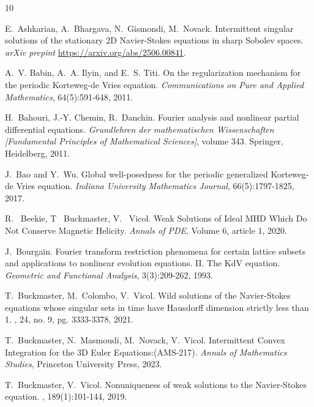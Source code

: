 \documentclass[12pt,reqno,letterpaper]{amsart}
\numberwithin{equation}{section}
\newcommand{\1}{{\bf 1}}
\newcommand{\2}{{\bf 2}}
\theoremstyle{remark}
\theoremstyle{remark}
\begin{document}
\begin{thebibliography}{10}

    E.~Ashkarian, A.~Bhargava, N.~Gismondi, M.~Novack.
    \newblock Intermittent singular solutions of the stationary 2D Navier-Stokes
    equations in sharp Sobolev spaces.
    \newblock \emph{arXiv prepint} \url{https://arxiv.org/abs/2506.00841}.

    A.~V. Babin, A.~A. Ilyin, and E.~S. Titi.
    \newblock On the regularization mechanism for the periodic
    Korteweg-de Vries equation.
    \newblock \emph{Communications on Pure and Applied Mathematics},
    64(5):591-648, 2011.

    H.~Bahouri, J.-Y. Chemin, R.~Danchin.
    \newblock Fourier analysis and nonlinear partial differential equations.
    \newblock \textit{Grundlehren der mathematischen Wissenschaften [Fundamental Principles of Mathematical Sciences]}, volume 343.  Springer, Heidelberg, 2011.

    J.~Bao and Y.~Wu.
    \newblock Global well-posedness for the periodic generalized
    Korteweg-de Vries equation.
    \newblock \emph{Indiana University Mathematics Journal}, 66(5):1797-1825, 2017.

    R. ~Beekie, T ~Buckmaster, V. ~Vicol.
    \newblock Weak Solutions of Ideal MHD Which Do Not Conserve Magnetic Helicity.
    \newblock \emph{Annals of PDE}, Volume 6, article 1, 2020.
    
    J.~Bourgain.
    \newblock Fourier transform restriction phenomena for certain lattice subsets
    and applications to nonlinear evolution equations. II. The \textsf{KdV} equation.
    \newblock \emph{Geometric and Functional Analysis}, 3(3):209-262, 1993.

    \newblock T.~Buckmaster, M.~Colombo, V.~Vicol.
    \newblock Wild solutions of the Navier-Stokes equations whose singular sets in time have Hausdorff dimension strictly less than 1.
    , 24, no. 9, pg. 3333-3378, 2021.
    

    \newblock T.~Buckmaster, N.~Masmoudi, M.~Novack, V.~Vicol.
    \newblock Intermittent Convex Integration for the 3D Euler Equations:(AMS-217).
    \newblock\emph{Annals of Mathematics Studies}, Princeton University Press, 2023.

    T.~Buckmaster, V.~Vicol.
    \newblock Nonuniqueness of weak solutions to the {N}avier-{S}tokes equation.
    , 189(1):101-144, 2019.


\end{thebibliography}
\end{document}
